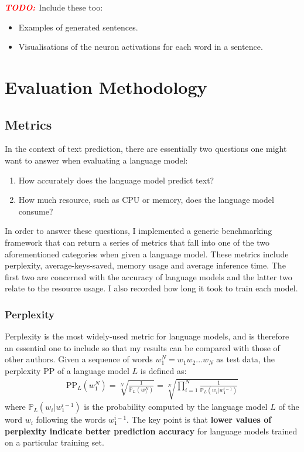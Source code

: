 \documentclass[a4paper, 12pt]{report}
\newcommand{\todo}{\textbf{\textit{\textcolor{red}{TODO: }}}}
\newcommand{\tbf}[1]{\textbf{#1}}
\begin{document}
\todo{Include these too:}
\begin{itemize}
\item
	Examples of generated sentences.
\item
	Visualisations of the neuron activations for each word in a sentence.
\end{itemize}

\section{Evaluation Methodology}

\subsection{Metrics} \label{metrics}

In the context of text prediction, there are essentially two questions one might want to answer when evaluating a language model:
\begin{enumerate}
\item
	How accurately does the language model predict text?
\item
	How much resource, such as CPU or memory, does the language model consume?
\end{enumerate}

In order to answer these questions, I implemented a generic benchmarking framework that can return a series of metrics that fall into one of the two aforementioned categories when given a language model. These metrics include perplexity, average-keys-saved, memory usage and average inference time. The first two are concerned with the accuracy of language models and the latter two relate to the resource usage. I also recorded how long it took to train each model.

\subsubsection{Perplexity}

Perplexity is the most widely-used metric for language models, and is therefore an essential one to include so that my results can be compared with those of other authors. Given a sequence of words $w_1^{N} = w_1w_2...w_N$ as test data, the perplexity PP of a language model $L$ is defined as:
\begin{gather} \label{eq:perplexity}
	\text{PP}_L(w_1^N) = \sqrt[N]{\frac{1}{\mathbb{P}_L(w_1^N)}} = \sqrt[N]{\prod_{i=1}^{N}\frac{1}{\mathbb{P}_L(w_i | w_1^{i-1})}}
\end{gather}
where $\mathbb{P}_L(w_i | w_1^{i-1})$ is the probability computed by the language model $L$ of the word $w_i$ following the words $w_1^{i-1}$. The key point is that \tbf{lower values of perplexity indicate better prediction accuracy} for language models trained on a particular training set. \\
\end{document}
